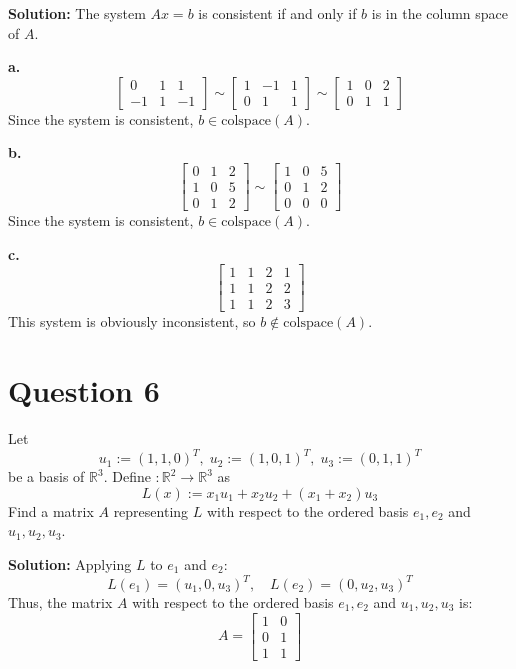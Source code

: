 \documentclass{article}
\begin{document}
\noindent\textbf{Solution:} The system $Ax = b$ is consistent if and only if $b$ is in the column space of $A$.

\vspace{0.25cm}
\noindent\textbf{a.}
$$
\left[\begin{array}{cc|c} 0 & 1 & 1 \\ -1 & 1 & -1 \end{array}\right] \sim
\left[\begin{array}{cc|c} 1 & -1 & 1 \\ 0 & 1 & 1 \end{array}\right] \sim
\left[\begin{array}{cc|c} 1 & 0 & 2 \\ 0 & 1 & 1 \end{array}\right]
$$
Since the system is consistent, $b \in \text{colspace}(A)$.

\vspace{0.25cm}
\noindent\textbf{b.}
$$
\left[\begin{array}{cc|c} 0 & 1 & 2 \\ 1 & 0 & 5 \\ 0 & 1 & 2 \end{array}\right] \sim
\left[\begin{array}{cc|c} 1 & 0 & 5 \\ 0 & 1 & 2 \\ 0 & 0 & 0 \end{array}\right]
$$
Since the system is consistent, $b \in \text{colspace}(A)$.

\vspace{0.25cm}
\noindent\textbf{c.}
$$ \left[\begin{array}{ccc|c} 1 & 1 & 2 & 1 \\ 1 & 1 & 2 & 2 \\ 1 & 1 & 2 & 3 \end{array}\right] $$
This system is obviously inconsistent, so $b \notin \text{colspace}(A)$.

\newpage
\section*{Question 6}
Let
$$
u_1 := (1, 1, 0)^T, \; u_2 := (1, 0, 1)^T, \; u_3 := (0, 1, 1)^T
$$
be a basis of $\mathbb{R}^3$. Define $: \mathbb{R}^2 \rightarrow \mathbb{R}^3$ as
$$ L(x) := x_1u_1 + x_2u_2 + (x_1 + x_2)u_3 $$
Find a matrix $A$ representing $L$ with respect to the ordered basis $e_1, e_2$ and $u_1, u_2, u_3$.

\vspace{0.25cm}
\noindent\textbf{Solution:}
\newline\noindent Applying $L$ to $e_1$ and $e_2$:
$$ L(e_1) = (u_1, 0, u_3)^T, \quad L(e_2) = (0, u_2, u_3)^T $$
Thus, the matrix $A$ with respect to the ordered basis $e_1, e_2$ and $u_1, u_2, u_3$ is:
$$ A = \begin{bmatrix} 1 & 0 \\ 0 & 1 \\ 1 & 1 \end{bmatrix} $$
\end{document}
